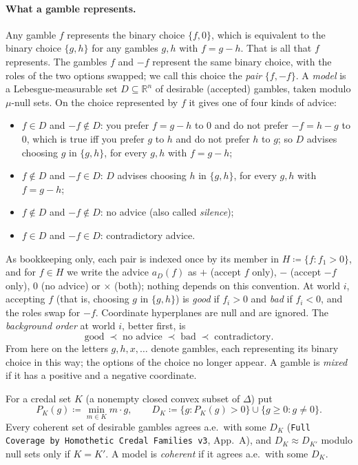 \documentclass[11pt]{article}
\theoremstyle{definition}
\theoremstyle{remark}
\newcommand{\R}{\mathbb R}
\newcommand{\src}[1]{\texttt{#1}}
\begin{document}
\paragraph{What a gamble represents.} Any gamble $f$ represents the binary choice $\{f,0\}$, which is equivalent to the binary choice $\{g,h\}$ for any gambles $g,h$ with $f=g-h$. That is all that $f$ represents. The gambles $f$ and $-f$ represent the same binary choice, with the roles of the two options swapped; we call this choice the \emph{pair} $\{f,-f\}$. A \emph{model} is a Lebesgue-measurable set $D\subseteq\R^n$ of desirable (accepted) gambles, taken modulo $\mu$-null sets. On the choice represented by $f$ it gives one of four kinds of advice:
\begin{itemize}[leftmargin=*]
\item $f\in D$ and $-f\notin D$: you prefer $f=g-h$ to $0$ and do not prefer $-f=h-g$ to $0$, which is true iff you prefer $g$ to $h$ and do not prefer $h$ to $g$; so $D$ advises choosing $g$ in $\{g,h\}$, for every $g,h$ with $f=g-h$;
\item $f\notin D$ and $-f\in D$: $D$ advises choosing $h$ in $\{g,h\}$, for every $g,h$ with $f=g-h$;
\item $f\notin D$ and $-f\notin D$: no advice (also called \emph{silence});
\item $f\in D$ and $-f\in D$: contradictory advice.
\end{itemize}
As bookkeeping only, each pair is indexed once by its member in $H\coloneqq\{f:f_1>0\}$, and for $f\in H$ we write the advice $a_D(f)$ as $+$ (accept $f$ only), $-$ (accept $-f$ only), $0$ (no advice) or $\times$ (both); nothing depends on this convention. At world $i$, accepting $f$ (that is, choosing $g$ in $\{g,h\}$) is \emph{good} if $f_i>0$ and \emph{bad} if $f_i<0$, and the roles swap for $-f$. Coordinate hyperplanes are null and are ignored. The \emph{background order} at world $i$, better first, is
\[
\text{good}\;\prec\;\text{no advice}\;\prec\;\text{bad}\;\prec\;\text{contradictory}.
\]
From here on the letters $g,h,x,\dots$ denote gambles, each representing its binary choice in this way; the options of the choice no longer appear.
A gamble is \emph{mixed} if it has a positive and a negative coordinate.

For a credal set $K$ (a nonempty closed convex subset of $\Delta$) put
\[
P_K(g)\coloneqq\min_{m\in K}m\cdot g,\qquad D_K\coloneqq\{g:P_K(g)>0\}\cup\{g\ge0:g\ne0\}.
\]
Every coherent set of desirable gambles agrees a.e.\ with some $D_K$ (\src{Full Coverage by Homothetic Credal Families v3}, App.~A), and $D_K\approx D_{K'}$ modulo null sets only if $K=K'$. A model is \emph{coherent} if it agrees a.e.\ with some $D_K$.
\end{document}
